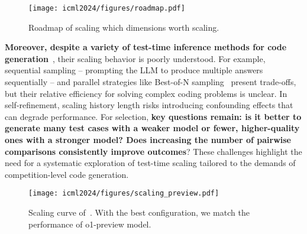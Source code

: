\begin{figure}
    \centering
    \texttt{[image: icml2024/figures/roadmap.pdf]}
\caption{Roadmap of scaling which dimensions worth scaling.}
\label{fig:roadmap}
\end{figure}


\textbf{Moreover, despite a variety of test-time inference methods for code generation}~\citep{chen2022codet}, their scaling behavior is poorly understood. For example, sequential sampling -- prompting the LLM to produce multiple answers sequentially -- and parallel strategies like Best-of-N sampling~\citep{} present trade-offs, but their relative efficiency for solving complex coding problems is unclear. In self-refinement, scaling history length risks introducing confounding effects that can degrade performance. For selection, \textbf{key questions remain: is it better to generate many test cases with a weaker model or fewer, higher-quality ones with a stronger model? Does increasing the number of pairwise comparisons consistently improve outcomes}? These challenges highlight the need for a systematic exploration of test-time scaling tailored to the demands of competition-level code generation.






\begin{figure*}
    \centering
    \texttt{[image: icml2024/figures/scaling\_preview.pdf]}
\caption{Scaling curve of~\frameworkname. With the best configuration, we match the performance of o1-preview model.}
\label{fig:scaling_preview}
\end{figure*}

